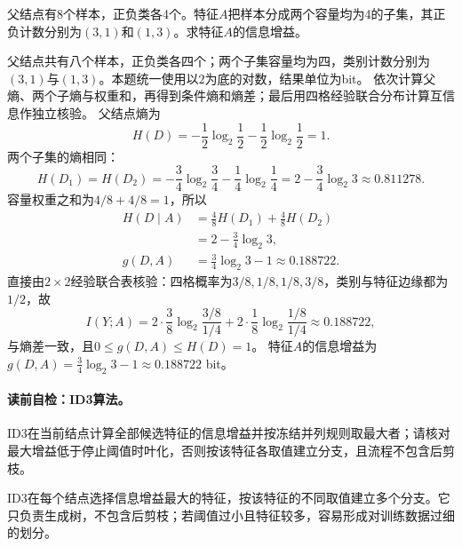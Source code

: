 \label{struct:V2-C04-CH18}
\begin{example}[八样本二叉划分的信息增益]\label{exm:V2-C04-information-gain}
父结点有8个样本，正负类各4个。特征$A$把样本分成两个容量均为4的子集，其正负计数分别为$(3,1)$和$(1,3)$。求特征$A$的信息增益。
\end{example}
\begin{solution}
\SolGiven 父结点共有八个样本，正负类各四个；两个子集容量均为四，类别计数分别为$(3,1)$与$(1,3)$。本题统一使用以$2$为底的对数，结果单位为bit。
\SolPlan 依次计算父熵、两个子熵与权重和，再得到条件熵和熵差；最后用四格经验联合分布计算互信息作独立核验。
\SolDerive
父结点熵为
\[
H(D)=-\frac12\log_2\frac12-\frac12\log_2\frac12=1.
\]
两个子集的熵相同：
\[
H(D_1)=H(D_2)
=-\frac34\log_2\frac34-\frac14\log_2\frac14
=2-\frac34\log_2 3\approx0.811278.
\]
容量权重之和为$4/8+4/8=1$，所以
\[
\begin{aligned}
H(D\mid A)
&=\frac48H(D_1)+\frac48H(D_2)\\
&=2-\frac34\log_2 3,\\
g(D,A)&=\frac34\log_2 3-1\approx0.188722.
\end{aligned}
\]
\SolCheck 直接由$2\times2$经验联合表核验：四格概率为$3/8,1/8,1/8,3/8$，类别与特征边缘都为$1/2$，故
\[
I(Y;A)=2\cdot\frac38\log_2\frac{3/8}{1/4}
+2\cdot\frac18\log_2\frac{1/8}{1/4}
\approx0.188722,
\]
与熵差一致，且$0\leq g(D,A)\leq H(D)=1$。
\SolAnswer 特征$A$的信息增益为$g(D,A)=\frac34\log_2 3-1\approx0.188722$ bit。
\end{solution}


\paragraph{读前自检：ID3算法。}ID3在当前结点计算全部候选特征的信息增益并按冻结并列规则取最大者；请核对最大增益低于停止阈值时叶化，否则按该特征各取值建立分支，且流程不包含后剪枝。\par

ID3在每个结点选择信息增益最大的特征，按该特征的不同取值建立多个分支。它只负责生成树，不包含后剪枝；若阈值过小且特征较多，容易形成对训练数据过细的划分。

